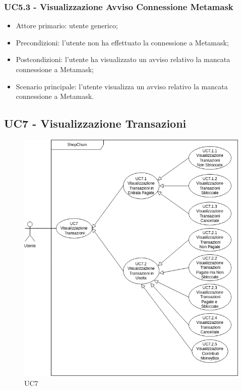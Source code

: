 \subsubsection{UC5.3 - Visualizzazione Avviso Connessione Metamask}

\begin{itemize}
    \item Attore primario: utente generico;
    \item Precondizioni: l'utente non ha effettuato la connessione a Metamask\glo{};
    \item Postcondizioni: l'utente ha visualizzato un avviso relativo la mancata connessione a Metamask\glo{};
    \item Scenario principale: l'utente visualizza un avviso relativo la mancata connessione a Metamask\glo{}.
\end{itemize}

\subsection{UC7 - Visualizzazione Transazioni}

\begin{figure}[H]
    \centering
    \includegraphics[scale=0.7]{immagini/UC7.png}
    \caption{UC7}
\end{figure}

